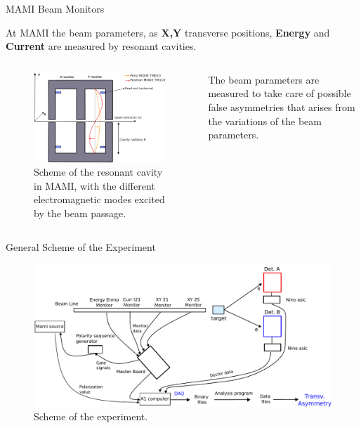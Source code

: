\documentclass[9pt,a4paper]{beamer}
\begin{document}
\begin{frame}[t]{MAMI Beam Monitors}

At MAMI the beam parameters, as \textbf{X,Y} transverse positions, \textbf{Energy} and \textbf{Current} are measured by resonant cavities.

\begin{columns}[T]
\begin{column}{0.60\textwidth}
\begin{center}
\begin{figure}
\includegraphics[width = 1\textwidth]{figures/Monitors.pdf}
\caption{Scheme of the resonant cavity in MAMI, with the different electromagnetic modes excited by the beam passage.}
\end{figure}
\end{center}
\end{column}
\begin{column}{0.40\textwidth}
The beam parameters are measured to take care of possible false asymmetries that arises from the variations of the beam parameters.
\end{column}
\end{columns}
\end{frame}

\begin{frame}{General Scheme of the Experiment}

\begin{figure}[hbtp]
\centering
\includegraphics[width = 1\textwidth]{figures/Electronic_scheme.pdf}
\caption{Scheme of the experiment.}
\end{figure}
\end{frame}
\end{document}
